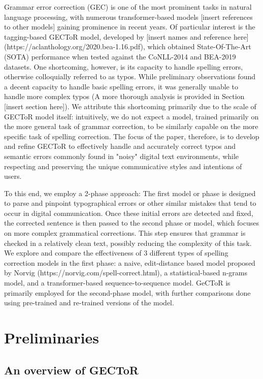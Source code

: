 \documentclass[sigconf, nonacm]{acmart}
\begin{document}
Grammar error correction (GEC) is one of the most prominent tasks in natural language processing, with numerous transformer-based models [insert references to other models] gaining prominence in recent years. Of particular interest is the tagging-based GECToR model, developed by [insert names and reference here] (https://aclanthology.org/2020.bea-1.16.pdf), which obtained State-Of-The-Art (SOTA) performance when tested against the CoNLL-2014 and BEA-2019 datasets. One shortcoming, however, is its capacity to handle spelling errors, otherwise colloquially referred to as typos. While preliminary observations found a decent capacity to handle basic spelling errors, it was generally unable to handle more complex typos (A more thorough analysis is provided in Section [insert section here]). We attribute this shortcoming primarily due to the scale of GECToR model itself: intuitively, we do not expect a model, trained primarily on the more general task of grammar correction, to be similarly capable on the more specific task of spelling correction. The focus of the paper, therefore, is to develop and refine GECToR to effectively handle and accurately correct typos and semantic errors commonly found in "noisy" digital text environments, while respecting and preserving the unique communicative styles and intentions of users. 

To this end, we employ a 2-phase approach: The first model or phase is designed to parse and pinpoint typographical errors or other similar mistakes that tend to occur in digital communication. Once these initial errors are detected and fixed, the corrected sentence is then passed to the second phase or model, which focuses on more complex grammatical corrections. This step ensures that grammar is checked in a relatively clean text, possibly reducing the complexity of this task. We explore and compare the effectiveness of 3 different types of spelling correction models in the first phase: a naive, edit-distance based model proposed by Norvig (https://norvig.com/spell-correct.html), a statistical-based n-grams model, and a transformer-based sequence-to-sequence model. GeCToR is primarily employed for the second-phase model, with further comparisons done using pre-trained and re-trained versions of the model. 

\section{Preliminaries}

\subsection{An overview of GECToR}
\end{document}
